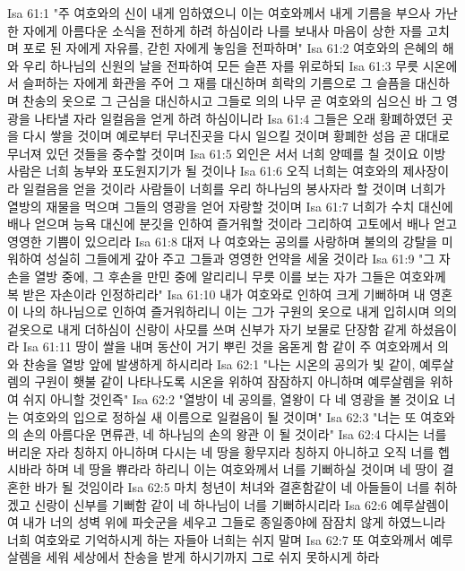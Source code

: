 Isa 61:1  "주 여호와의 신이 내게 임하였으니 이는 여호와께서 내게 기름을 부으사 가난한 자에게 아름다운 소식을 전하게 하려 하심이라 나를 보내사 마음이 상한 자를 고치며 포로 된 자에게 자유를, 갇힌 자에게 놓임을 전파하며"
Isa 61:2  여호와의 은혜의 해와 우리 하나님의 신원의 날을 전파하여 모든 슬픈 자를 위로하되
Isa 61:3  무릇 시온에서 슬퍼하는 자에게 화관을 주어 그 재를 대신하며 희락의 기름으로 그 슬픔을 대신하며 찬송의 옷으로 그 근심을 대신하시고 그들로 의의 나무 곧 여호와의 심으신 바 그 영광을 나타낼 자라 일컬음을 얻게 하려 하심이니라
Isa 61:4  그들은 오래 황폐하였던 곳을 다시 쌓을 것이며 예로부터 무너진곳을 다시 일으킬 것이며 황폐한 성읍 곧 대대로 무너져 있던 것들을 중수할 것이며
Isa 61:5  외인은 서서 너희 양떼를 칠 것이요 이방 사람은 너희 농부와 포도원지기가 될 것이나
Isa 61:6  오직 너희는 여호와의 제사장이라 일컬음을 얻을 것이라 사람들이 너희를 우리 하나님의 봉사자라 할 것이며 너희가 열방의 재물을 먹으며 그들의 영광을 얻어 자랑할 것이며
Isa 61:7  너희가 수치 대신에 배나 얻으며 능욕 대신에 분깃을 인하여 즐거워할 것이라 그리하여 고토에서 배나 얻고 영영한 기쁨이 있으리라
Isa 61:8  대저 나 여호와는 공의를 사랑하며 불의의 강탈을 미워하여 성실히 그들에게 갚아 주고 그들과 영영한 언약을 세울 것이라
Isa 61:9  "그 자손을 열방 중에, 그 후손을 만민 중에 알리리니 무릇 이를 보는 자가 그들은 여호와께 복 받은 자손이라 인정하리라"
Isa 61:10  내가 여호와로 인하여 크게 기뻐하며 내 영혼이 나의 하나님으로 인하여 즐거워하리니 이는 그가 구원의 옷으로 내게 입히시며 의의 겉옷으로 내게 더하심이 신랑이 사모를 쓰며 신부가 자기 보물로 단장함 같게 하셨음이라
Isa 61:11  땅이 쌀을 내며 동산이 거기 뿌린 것을 움돋게 함 같이 주 여호와께서 의와 찬송을 열방 앞에 발생하게 하시리라
Isa 62:1  "나는 시온의 공의가 빛 같이, 예루살렘의 구원이 횃불 같이 나타나도록 시온을 위하여 잠잠하지 아니하며 예루살렘을 위하여 쉬지 아니할 것인즉"
Isa 62:2  "열방이 네 공의를, 열왕이 다 네 영광을 볼 것이요 너는 여호와의 입으로 정하실 새 이름으로 일컬음이 될 것이며"
Isa 62:3  "너는 또 여호와의 손의 아름다운 면류관, 네 하나님의 손의 왕관 이 될 것이라"
Isa 62:4  다시는 너를 버리운 자라 칭하지 아니하며 다시는 네 땅을 황무지라 칭하지 아니하고 오직 너를 헵시바라 하며 네 땅을 쀼라라 하리니 이는 여호와께서 너를 기뻐하실 것이며 네 땅이 결혼한 바가 될 것임이라
Isa 62:5  마치 청년이 처녀와 결혼함같이 네 아들들이 너를 취하겠고 신랑이 신부를 기뻐함 같이 네 하나님이 너를 기뻐하시리라
Isa 62:6  예루살렘이여 내가 너의 성벽 위에 파숫군을 세우고 그들로 종일종야에 잠잠치 않게 하였느니라 너희 여호와로 기억하시게 하는 자들아 너희는 쉬지 말며
Isa 62:7  또 여호와께서 예루살렘을 세워 세상에서 찬송을 받게 하시기까지 그로 쉬지 못하시게 하라
